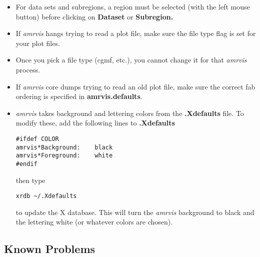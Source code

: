 \begin{itemize}

\item For data sets and subregions, a region must be selected (with
the left mouse button) before clicking on {\bf Dataset} or {\bf Subregion.}
    
\item If {\em amrvis} hangs trying to read a plot file, make sure the file type
flag is set for your plot files.

\item Once you pick a file type (cgmf, etc.), you cannot change it for that
{\em amrvis} process.

\item If {\em amrvis} core dumps trying to read an old plot file, make
sure the correct fab ordering is specified in {\bf amrvis.defaults}.


\item {\em amrvis} takes background and lettering colors from
the {\bf .Xdefaults} file.
To modify these, add the following lines to {\bf .Xdefaults}

\begin{verbatim}
#ifdef COLOR
amrvis*Background:    black
amrvis*Foreground:    white
#endif
\end{verbatim}

then type

\begin{verbatim}
xrdb ~/.Xdefaults
\end{verbatim}

to update the X database.  This will turn the {\em amrvis} background to black
and the lettering white (or whatever colors are chosen).

\end{itemize}


\subsection{Known Problems}

